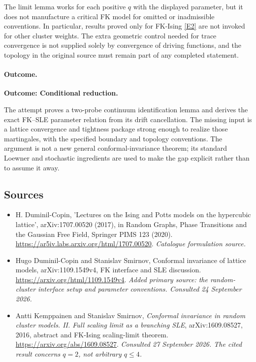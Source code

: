 \documentclass[11pt,a4paper]{article}
\newcommand{\eref}[2]{\hyperlink{extra:#1:#2}{[E#2]}}
\numberwithin{equation}{section}
\begin{document}
The limit lemma works for each positive $q$ with the displayed parameter,
but it does not manufacture a critical FK model for omitted or inadmissible
conventions. In particular, results proved only for FK-Ising
\eref{statement}{2} are not invoked for other cluster weights. The extra geometric
control needed for trace convergence is not supplied solely by convergence
of driving functions, and the topology in the original source must remain
part of any completed statement.

\paragraph{Outcome.}
\textbf{Outcome: Conditional reduction.}

The attempt proves a two-probe continuum identification lemma and derives
the exact FK--SLE parameter relation from its drift cancellation. The
missing input is a lattice convergence and tightness package strong enough
to realize those martingales, with the specified boundary and topology
conventions. The argument is not a new general conformal-invariance theorem;
its standard Loewner and stochastic ingredients are used to make the gap
explicit rather than to assume it away.
\subsection{Sources}
\begin{itemize}\raggedright
\item[\textnormal{[S1]}]\hypertarget{source:statement:1}{} H. Duminil-Copin, 'Lectures on the Ising and Potts models on the hypercubic lattice', arXiv:1707.00520 (2017), in Random Graphs, Phase Transitions and the Gaussian Free Field, Springer PIMS 123 (2020).
\url{https://ar5iv.labs.arxiv.org/html/1707.00520}.
{\small\textit{Catalogue formulation source.}}
\item[\textnormal{[E1]}]\hypertarget{extra:statement:1}{} Hugo Duminil-Copin and Stanislav Smirnov, Conformal invariance of lattice models, arXiv:1109.1549v4, FK interface and SLE discussion.
\url{https://arxiv.org/html/1109.1549v4}.
{\small\textit{Added primary source: the random-cluster interface setup and parameter conventions. Consulted 24 September 2026.}}
\item[\textnormal{[E2]}]\hypertarget{extra:statement:2}{} Antti Kemppainen and
Stanislav Smirnov, \emph{Conformal invariance in random cluster models.
II. Full scaling limit as a branching SLE}, arXiv:1609.08527, 2016,
abstract and FK-Ising scaling-limit theorem.
\url{https://arxiv.org/abs/1609.08527}.
{\small\textit{Consulted 27 September 2026. The cited result concerns
$q=2$, not arbitrary $q\le4$.}}
\end{itemize}
\end{document}
